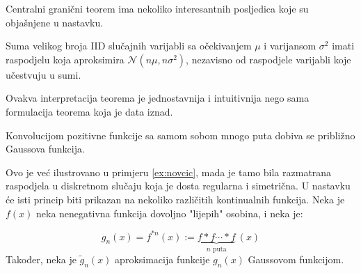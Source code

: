 Centralni granični teorem ima nekoliko interesantnih posljedica koje su
objašnjene u nastavku.

\setcounter{corollary}{0}
\begin{corollary}

  Suma velikog broja IID slučajnih varijabli sa očekivanjem $\mu$ i varijansom
  $\sigma^2$ imati raspodjelu koja aproksimira $\mathcal{N}(n\mu, n\sigma^2)$,
  nezavisno od raspodjele varijabli koje učestvuju u sumi. 

\end{corollary}

Ovakva interpretacija teorema je jednostavnija i intuitivnija nego sama
formulacija teorema koja je data iznad.

\begin{corollary}
  Konvolucijom pozitivne funkcije sa samom sobom mnogo puta dobiva se približno
  Gaussova funkcija.
\end{corollary}

Ovo je već ilustrovano u primjeru \ref{ex:novcic}, mada je tamo bila razmatrana
raspodjela u diskretnom slučaju koja je dosta regularna i simetrična. U nastavku
će isti princip biti prikazan na nekoliko različitih kontinualnih funkcija. Neka
je $f(x)$ neka nenegativna funkcija dovoljno "lijepih" osobina, i neka je:

\begin{equation}
  g_n(x) = f^{*n}(x) := \underbrace{f*f\cdots*f}_{n\text{ puta}}\ (x)
\end{equation}
%
Također, neka je $\widetilde{g}_n(x)$ aproksimacija funkcije $g_n(x)$ Gaussovom
funkcijom. \\

